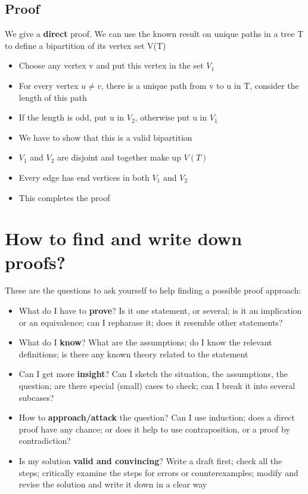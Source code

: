 \documentclass{article}[18pt]
\begin{document}
\subsection{Proof}
We give a \textbf{direct} proof. We can use the known result on unique paths in a tree T to define a bipartition of its vertex set V(T)
\begin{itemize}
	\item Choose any vertex v and put this vertex in the set $V_1$
	\item For every vertex $u\neq v$, there is a unique path from v to u in T, consider the length of this path
	\item If the length is odd, put u in $V_2$, otherwise put u in $V_1$
	\item We have to show that this is a valid bipartition
	\item $V_1$ and $V_2$ are disjoint and together make up $V(T)$
	\item Every edge has end vertices in both $V_1$ and $V_2$
	\item This completes the proof
\end{itemize}
\section{How to find and write down proofs?}
These are the questions to ask yourself to help finding a possible proof approach:
\begin{itemize}
	\item What do I have to \textbf{prove}? Is it one statement, or several; is it an implication or an equivalence; can I repharase it; does it resemble other statements?
	\item What do I \textbf{know}? What are the assumptions; do I know the relevant definitions; is there any known theory related to the statement
	\item Can I get more \textbf{insight}? Can I sketch the situation, the assumptions, the question; are there special (small) cases to check; can I break it into several subcases?
	\item How to \textbf{approach/attack} the question? Can I use induction; does a direct proof have any chance; or does it help to use contraposition, or a proof by contradiction?
	\item Is my solution \textbf{valid and convincing}? Write a draft first; check all the steps; critically examine the steps for errors or counterexamples; modify and revise the solution and write it down in a clear way
\end{itemize}
\end{document}
